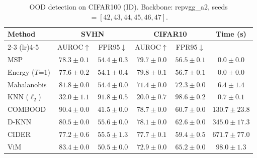\begin{table}[h!]
\centering
\caption{OOD detection on CIFAR100 (ID). Backbone: repvgg_a2, seeds$=[42, 43, 44, 45, 46, 47]$.}
\footnotesize
\begin{tabular}{lccccc}
\toprule
\textbf{Method} & \multicolumn{2}{c}{\textbf{SVHN}} & \multicolumn{2}{c}{\textbf{CIFAR10}} & \textbf{Time (s)} \\
\cmidrule(lr){2-3}
\cmidrule(lr){4-5}
 & AUROC$\uparrow$ & FPR95$\downarrow$ & AUROC$\uparrow$ & FPR95$\downarrow$ & \\
\midrule
MSP 
& $78.3 \pm 0.1$ 
& $54.4 \pm 0.3$ 
& $79.7 \pm 0.0$ 
& $56.5 \pm 0.1$ 
& $0.0 \pm 0.0$ \\
Energy ($T$=1) 
& $77.6 \pm 0.2$ 
& $54.1 \pm 0.4$ 
& $79.8 \pm 0.1$ 
& $56.7 \pm 0.1$ 
& $0.0 \pm 0.0$ \\
Mahalanobis 
& $81.8 \pm 0.0$ 
& $54.4 \pm 0.0$ 
& $71.4 \pm 0.0$ 
& $72.3 \pm 0.0$ 
& $6.4 \pm 1.4$ \\
KNN ($\ell_2$) 
& $32.0 \pm 1.1$ 
& $91.8 \pm 0.5$ 
& $20.0 \pm 0.7$ 
& $98.6 \pm 0.2$ 
& $0.7 \pm 0.1$ \\
COMBOOD 
& $90.4 \pm 0.0$ 
& $41.5 \pm 0.0$ 
& $78.7 \pm 0.0$ 
& $60.7 \pm 0.0$ 
& $130.7 \pm 23.8$ \\
D-KNN 
& $80.5 \pm 0.0$ 
& $55.6 \pm 0.0$ 
& $78.1 \pm 0.0$ 
& $62.6 \pm 0.0$ 
& $345.0 \pm 17.3$ \\
CIDER 
& $77.2 \pm 0.6$ 
& $55.5 \pm 1.3$ 
& $77.7 \pm 0.1$ 
& $59.4 \pm 0.5$ 
& $671.7 \pm 77.0$ \\
ViM 
& $83.4 \pm 0.0$ 
& $50.5 \pm 0.0$ 
& $72.9 \pm 0.0$ 
& $65.2 \pm 0.0$ 
& $98.0 \pm 1.3$
\bottomrule
\end{tabular}
\end{table}
